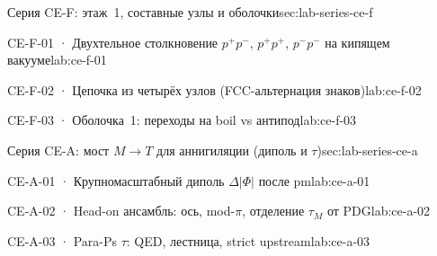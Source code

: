 
\begin{labseries}{Серия CE-F: этаж~1, составные узлы и оболочки}{sec:lab-series-ce-f}

\begin{labrecord}{CE-F-01 · Двухтельное столкновение $p^+p^-$, $p^+p^+$, $p^-p^-$ на кипящем вакууме}{lab:ce-f-01}

\end{labrecord}

\begin{labrecord}{CE-F-02 · Цепочка из четырёх узлов (FCC-альтернация знаков)}{lab:ce-f-02}

\end{labrecord}

\begin{labrecord}{CE-F-03 · Оболочка~1: переходы на boil vs антипод}{lab:ce-f-03}

\end{labrecord}

\end{labseries}

\begin{labseries}{Серия CE-A: мост $M\to T$ для аннигиляции (диполь и $\tau$)}{sec:lab-series-ce-a}

\begin{labrecord}{CE-A-01 · Крупномасштабный диполь $\Delta|\Phi|$ после pm}{lab:ce-a-01}

\end{labrecord}

\begin{labrecord}{CE-A-02 · Head-on ансамбль: ось, mod-$\pi$, отделение $\tau_M$ от PDG}{lab:ce-a-02}

\end{labrecord}

\begin{labrecord}{CE-A-03 · Para-Ps $\tau$: QED, лестница, strict upstream}{lab:ce-a-03}

\end{labrecord}

\end{labseries}
